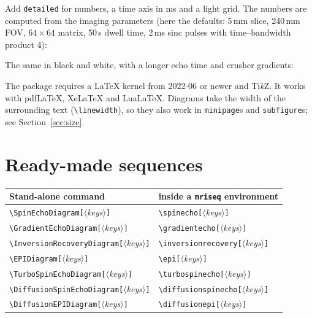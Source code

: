 \documentclass[11pt]{article}
\newcommand\cs[1]{\texttt{\textbackslash#1}}
\newcommand\key[1]{\texttt{#1}}
\newcommand\meta[1]{\ensuremath{\langle}\textit{#1}\ensuremath{\rangle}}
\newcommand\oarg[1]{\texttt{[}\meta{#1}\texttt{]}}
\begin{document}
\begin{example}
\SpinEchoDiagram
\end{example}

Add \key{detailed} for numbers, a time axis in ms and a light grid. The
numbers are computed from the imaging parameters (here the defaults:
5\,mm slice, 240\,mm FOV, $64\times64$ matrix, 50\,\textmu s dwell time,
2\,ms sinc pulses with time--bandwidth product 4):
\begin{example}
\SpinEchoDiagram[detailed, rows={rf,gz,gy,gx,adc}]
\end{example}

The same in black and white, with a longer echo time and crusher gradients:
\begin{example}
\SpinEchoDiagram[style=bw, TE=12, crushers, values]
\end{example}

The package requires a \LaTeX{} kernel from 2022-06 or newer and Ti\emph{k}Z.
It works with pdf\LaTeX, Xe\LaTeX{} and Lua\LaTeX. Diagrams take the width of
the surrounding text (\cs{linewidth}), so they also work in \texttt{minipage}s
and \texttt{subfigure}s; see Section~\ref{sec:size}.

\section{Ready-made sequences}

\begin{center}
\begin{tabular}{@{}ll@{}}
\toprule
Stand-alone command & inside a \texttt{mriseq} environment \\
\midrule
\cs{SpinEchoDiagram}\oarg{keys}          & \cs{spinecho}\oarg{keys} \\
\cs{GradientEchoDiagram}\oarg{keys}      & \cs{gradientecho}\oarg{keys} \\
\cs{InversionRecoveryDiagram}\oarg{keys} & \cs{inversionrecovery}\oarg{keys} \\
\cs{EPIDiagram}\oarg{keys}               & \cs{epi}\oarg{keys} \\
\cs{TurboSpinEchoDiagram}\oarg{keys}     & \cs{turbospinecho}\oarg{keys} \\
\cs{DiffusionSpinEchoDiagram}\oarg{keys} & \cs{diffusionspinecho}\oarg{keys} \\
\cs{DiffusionEPIDiagram}\oarg{keys}      & \cs{diffusionepi}\oarg{keys} \\
\bottomrule
\end{tabular}
\end{center}
\end{document}
